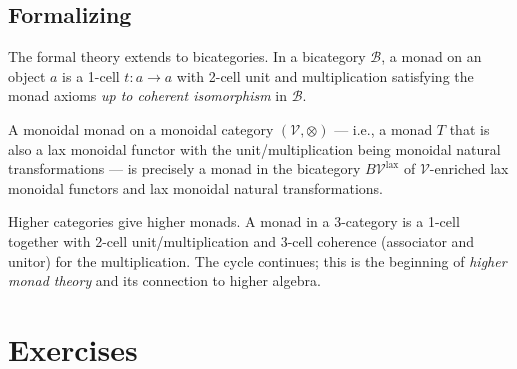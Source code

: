 \subsection{Formalizing}

The formal theory extends to bicategories. In a bicategory $\mathcal{B}$, a
monad on an object $a$ is a 1-cell $t : a \to a$ with 2-cell unit and
multiplication satisfying the monad axioms \emph{up to coherent isomorphism}
in $\mathcal{B}$.

\begin{example_thm}
A monoidal monad on a monoidal category $(\mathcal{V}, \otimes)$ — i.e., a
monad $T$ that is also a lax monoidal functor with the unit/multiplication
being monoidal natural transformations — is precisely a monad in the
bicategory $B\mathcal{V}^{\mathrm{lax}}$ of $\mathcal{V}$-enriched lax
monoidal functors and lax monoidal natural transformations.
\end{example_thm}

\begin{remark}
Higher categories give higher monads. A monad in a 3-category is a 1-cell
together with 2-cell unit/multiplication and 3-cell coherence (associator
and unitor) for the multiplication. The cycle continues; this is the
beginning of \emph{higher monad theory} and its connection to higher
algebra.
\end{remark}


\section{Exercises}
\label{sec:formal-monad-exercises}

